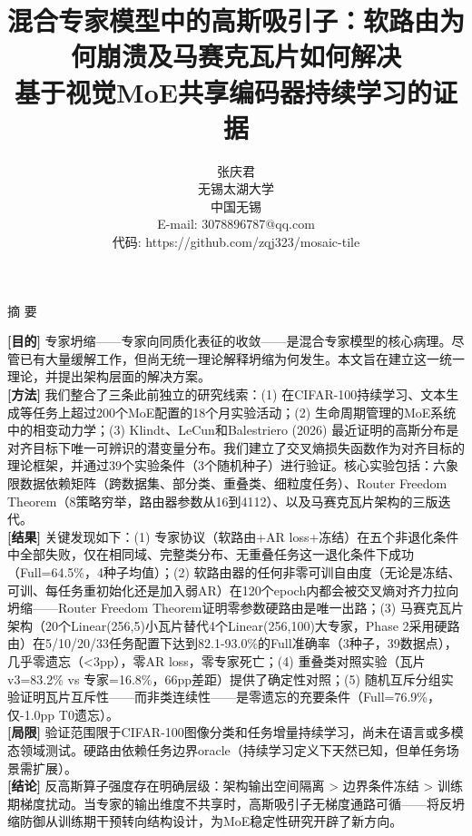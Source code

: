 \documentclass[twoside]{article}
\theoremstyle{definition}
\begin{document}
\title{{\heiti{} 混合专家模型中的高斯吸引子：软路由为何崩溃及马赛克瓦片如何解决}\\{ 基于视觉MoE共享编码器持续学习的证据}}

\author{
{\heiti{} 张庆君}\\[4pt]
{\songti{} 无锡太湖大学}\\[2pt]
{\songti{} 中国\quad 无锡}\\[2pt]
{\kaishu{} E-mail: 3078896787@qq.com}\\[2pt]
{\kaishu{} 代码: https://github.com/zqj323/mosaic-tile}
}
\date{}

\maketitle

\begin{center}
{\heiti{} 摘 \quad 要}
\end{center}

{
{\bf [目的]} 专家坍缩——专家向同质化表征的收敛——是混合专家模型的核心病理。尽管已有大量缓解工作，但尚无统一理论解释坍缩为何发生。本文旨在建立这一统一理论，并提出架构层面的解决方案。\\

{\bf [方法]} 我们整合了三条此前独立的研究线索：(1) 在CIFAR-100持续学习、文本生成等任务上超过200个MoE配置的18个月实验活动；(2) 生命周期管理的MoE系统中的相变动力学；(3) Klindt、LeCun和Balestriero (2026) 最近证明的高斯分布是对齐目标下唯一可辨识的潜变量分布。我们建立了交叉熵损失函数作为对齐目标的理论框架，并通过39个实验条件（3个随机种子）进行验证。核心实验包括：六象限数据依赖矩阵（跨数据集、部分类、重叠类、细粒度任务）、Router Freedom Theorem（8策略穷举，路由器参数从16到4112）、以及马赛克瓦片架构的三版迭代。\\

{\bf [结果]} 关键发现如下：(1) 专家协议（软路由+AR loss+冻结）在五个非退化条件中全部失败，仅在相同域、完整类分布、无重叠任务这一退化条件下成功（Full=64.5\%，4种子均值）；(2) 软路由器的任何非零可训自由度（无论是冻结、可训、每任务重初始化还是加入弱AR）在120个epoch内都会被交叉熵对齐力拉向坍缩——Router Freedom Theorem证明零参数硬路由是唯一出路；(3) 马赛克瓦片架构（20个Linear(256,5)小瓦片替代4个Linear(256,100)大专家，Phase 2采用硬路由）在5/10/20/33任务配置下达到82.1-93.0\%的Full准确率（3种子，39数据点），几乎零遗忘（<3pp），零AR loss，零专家死亡；(4) 重叠类对照实验（瓦片v3=83.2\% vs 专家=16.8\%，66pp差距）提供了确定性对照；(5) 随机互斥分组实验证明瓦片互斥性——而非类连续性——是零遗忘的充要条件（Full=76.9\%，仅-1.0pp T0遗忘）。\\

{\bf [局限]} 验证范围限于CIFAR-100图像分类和任务增量持续学习，尚未在语言或多模态领域测试。硬路由依赖任务边界oracle（持续学习定义下天然已知，但单任务场景需扩展）。\\

{\bf [结论]} 反高斯算子强度存在明确层级：架构输出空间隔离 > 边界条件冻结 > 训练期梯度扰动。当专家的输出维度不共享时，高斯吸引子无梯度通路可循——将反坍缩防御从训练期干预转向结构设计，为MoE稳定性研究开辟了新方向。
}
\end{document}
